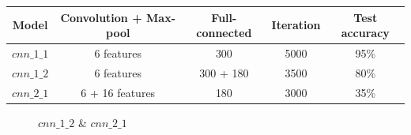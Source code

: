 \documentclass{article}
\begin{document}
\begin{center}
	\label{tab-6}
	\begin{tabular}{ccccc}
		\toprule
		Model & Convolution + Max-pool & Full-connected & Iteration & Test accuracy \\
		\midrule
		$cnn\_1\_1$ & 6 features & 300 & 5000 & 95\% \\
		$cnn\_1\_2$ & 6 features & 300 + 180 &3500 & 80\% \\
		$cnn\_2\_1$ & 6 + 16 features & 180 & 3000 & 35\% \\
		\bottomrule
	\end{tabular}
\end{center}

\begin{figure}
	\centering
	\caption{$cnn\_1\_2$ \& $cnn\_2\_1$}
	\label{fig-7}
\end{figure}
\end{document}

